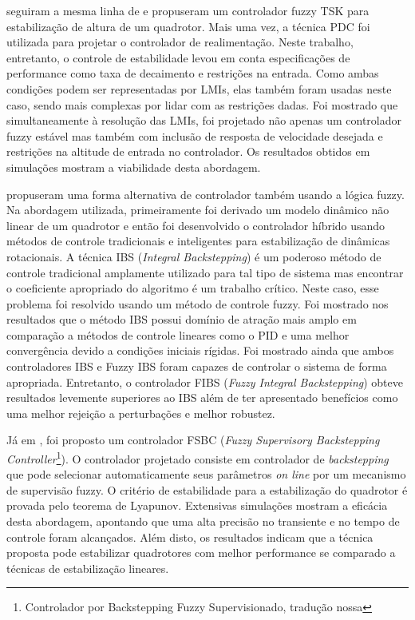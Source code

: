  seguiram a mesma linha de  e propuseram um controlador fuzzy TSK para estabilização de altura de um quadrotor. Mais uma vez, a técnica PDC foi utilizada para projetar o controlador de realimentação. Neste trabalho, entretanto, o controle de estabilidade levou em conta especificações de performance como taxa de decaimento e restrições na entrada. Como ambas condições podem ser representadas por LMIs, elas também foram usadas neste caso, sendo mais complexas por lidar com as restrições dadas. Foi mostrado que simultaneamente à resolução das LMIs, foi projetado não apenas um controlador fuzzy estável mas também com inclusão de resposta de velocidade desejada e restrições na altitude de entrada no controlador. Os resultados obtidos em simulações mostram a viabilidade desta abordagem.

 propuseram uma forma alternativa de controlador também usando a lógica fuzzy. Na abordagem utilizada, primeiramente foi derivado um modelo dinâmico não linear de um quadrotor e então foi desenvolvido o controlador híbrido usando métodos de controle tradicionais e inteligentes para estabilização de dinâmicas rotacionais. A técnica IBS (\textit{Integral Backstepping}) é um poderoso método de controle tradicional amplamente utilizado para tal tipo de sistema mas encontrar o coeficiente apropriado do algoritmo é um trabalho crítico. Neste caso, esse problema foi resolvido usando um método de controle fuzzy. Foi mostrado nos resultados que o método IBS possui domínio de atração mais amplo em comparação a métodos de controle lineares como o PID e uma melhor convergência devido a condições iniciais rígidas. Foi mostrado ainda que ambos controladores IBS e Fuzzy IBS foram capazes de controlar o sistema de forma apropriada. Entretanto, o controlador FIBS (\textit{Fuzzy Integral Backstepping}) obteve resultados levemente superiores ao IBS além de ter apresentado benefícios como uma melhor rejeição a perturbações e melhor robustez.

Já em \cite{Ariffanan2014}, foi proposto um controlador FSBC (\textit{Fuzzy Supervisory Backstepping Controller}\footnote{Controlador por Backstepping Fuzzy Supervisionado, tradução nossa}). O controlador projetado consiste em controlador de \textit{backstepping} que pode selecionar automaticamente seus parâmetros \textit{on line} por um mecanismo de supervisão fuzzy. O critério de estabilidade para a estabilização do quadrotor é provada pelo teorema de Lyapunov. Extensivas simulações mostram a eficácia desta abordagem, apontando que uma alta precisão no transiente e no tempo de controle foram alcançados. Além disto, os resultados indicam que a técnica proposta pode estabilizar quadrotores com melhor performance se comparado a técnicas de estabilização lineares.

